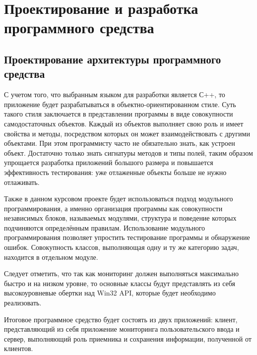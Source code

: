 \section{Проектирование и разработка программного средства} 
\label{sec:development}

\subsection{Проектирование архитектуры программного средства} 
\label{sec:development:arch}

С учетом того, что выбранным языком для разработки является С++, то приложение будет разрабатываться в объектно-ориентированном стиле. Суть такого стиля заключается в представлении программы в виде совокупности самодостаточных объектов. Каждый из объектов выполняет свою роль и имеет свойства и методы, посредством которых он может взаимодействовать с другими объектами. При этом программисту часто не обязательно знать, как устроен объект. Достаточно только знать сигнатуры методов и типы полей, таким образом упрощается разработка приложений большого размера и повышается эффективность тестирования: уже отлаженные объекты больше не нужно отлаживать.

Также в данном курсовом проекте будет использоваться подход модульного программирования, 
а именно организация программы как совокупности независимых блоков, называемых модулями, 
структура и поведение которых подчиняются определённым правилам. 
Использование модульного программирования позволяет упростить тестирование программы и обнаружение ошибок. 
Совокупность классов, выполняющая одну и ту же категорию задач, находится в отдельном модуле.

Следует отметить, что так как мониторинг должен выполняться максимально быстро и на низком уровне, то основные классы будут представлять из себя высокоуровневые обертки над Win32 API, которые будет необходимо реализовать.

Итоговое программное средство будет состоять из двух приложений: клиент, представляющий из себя приложение мониторинга пользовательского ввода и сервер, выполняющий роль приемника и сохранения информации, полученной от клиентов.

